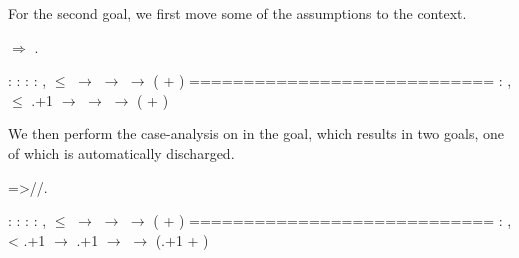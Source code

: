 For the second goal, we first move some of the assumptions to the context.


\begin{coqdoccode}
\coqdocemptyline
\coqdocnoindent
{}\ensuremath{\Rightarrow} .\coqdoceol
\coqdocemptyline
\end{coqdoccode}


\coqdoceol
\coqdocemptyline
\coqdocindent{1.00em}
 : \coqdoceol
\coqdocindent{1.00em}
 : \coqdoceol
\coqdocindent{1.00em}
 : \coqdockw{\ensuremath{\forall}}  : ,  \ensuremath{\le}  \ensuremath{\rightarrow}   \ensuremath{\rightarrow}   \ensuremath{\rightarrow}  ( + )\coqdoceol
\coqdocindent{1.00em}
============================\coqdoceol
\coqdocindent{1.50em}
\coqdockw{\ensuremath{\forall}}  : ,  \ensuremath{\le} .+1 \ensuremath{\rightarrow}   \ensuremath{\rightarrow}   \ensuremath{\rightarrow}  ( + )

\coqdocemptyline


We then perform the case-analysis on  in the goal, which results
in two goals, one of which is automatically discharged.


\begin{coqdoccode}
\coqdocemptyline
\coqdocnoindent
{}=>//.\coqdoceol
\coqdocemptyline
\end{coqdoccode}


\coqdoceol
\coqdocemptyline
\coqdocindent{1.00em}
 : \coqdoceol
\coqdocindent{1.00em}
 : \coqdoceol
\coqdocindent{1.00em}
 : \coqdockw{\ensuremath{\forall}}  : ,  \ensuremath{\le}  \ensuremath{\rightarrow}   \ensuremath{\rightarrow}   \ensuremath{\rightarrow}  ( + )\coqdoceol
\coqdocindent{1.00em}
============================\coqdoceol
\coqdocindent{1.50em}
\coqdockw{\ensuremath{\forall}}  : ,  < .+1 \ensuremath{\rightarrow}  .+1 \ensuremath{\rightarrow}   \ensuremath{\rightarrow}  (.+1 + )


